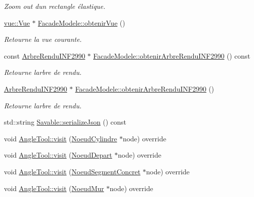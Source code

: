 \begin{DoxyCompactItemize}
\begin{DoxyCompactList}\small\item\em Zoom out d\textquotesingle{}un rectangle élastique. \end{DoxyCompactList}\item 
\hyperlink{classvue_1_1_vue}{vue\+::\+Vue} $\ast$ \hyperlink{group__inf2990_gaa56cf96b7e381e0f14e2c9a55be913bf}{Facade\+Modele\+::obtenir\+Vue} ()
\begin{DoxyCompactList}\small\item\em Retourne la vue courante. \end{DoxyCompactList}\item 
const \hyperlink{class_arbre_rendu_i_n_f2990}{Arbre\+Rendu\+I\+N\+F2990} $\ast$ \hyperlink{group__inf2990_gaf578161d03b2157cdaa3182900ff61cc}{Facade\+Modele\+::obtenir\+Arbre\+Rendu\+I\+N\+F2990} () const 
\begin{DoxyCompactList}\small\item\em Retourne l\textquotesingle{}arbre de rendu. \end{DoxyCompactList}\item 
\hyperlink{class_arbre_rendu_i_n_f2990}{Arbre\+Rendu\+I\+N\+F2990} $\ast$ \hyperlink{group__inf2990_ga12d5594db6a9507b24c7e1ffcd6751af}{Facade\+Modele\+::obtenir\+Arbre\+Rendu\+I\+N\+F2990} ()
\begin{DoxyCompactList}\small\item\em Retourne l\textquotesingle{}arbre de rendu. \end{DoxyCompactList}\item 
std\+::string \hyperlink{group__inf2990_ga454a7c175c0864c3656283bafcb8413e}{Savable\+::serialize\+Json} () const 
\item 
void \hyperlink{group__inf2990_ga925fee2b000babaae1c7947a732a0bba}{Angle\+Tool\+::visit} (\hyperlink{class_noeud_cylindre}{Noeud\+Cylindre} $\ast$node) override
\item 
void \hyperlink{group__inf2990_gaaa2fc24bde51948c2288c375f19d70ae}{Angle\+Tool\+::visit} (\hyperlink{class_noeud_depart}{Noeud\+Depart} $\ast$node) override
\item 
void \hyperlink{group__inf2990_ga0209990747f5f623c71076c02a3ed018}{Angle\+Tool\+::visit} (\hyperlink{class_noeud_segment_concret}{Noeud\+Segment\+Concret} $\ast$node) override
\item 
void \hyperlink{group__inf2990_ga5bf124eb8955a829e87743cc6a737b49}{Angle\+Tool\+::visit} (\hyperlink{class_noeud_mur}{Noeud\+Mur} $\ast$node) override
\item 

\end{DoxyCompactItemize}
